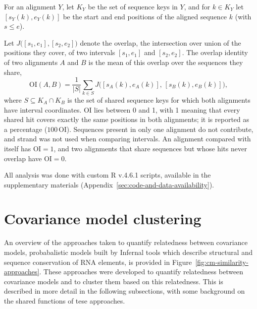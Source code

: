 For an alignment $Y$, let $K_Y$ be the set of sequence keys in $Y$, and for $k \in K_Y$ let $[s_Y(k), e_Y(k)]$ be the start and end positions of the aligned sequence $k$ (with $s \le e$).
 
Let $J\bigl([s_1, e_1], [s_2, e_2]\bigr)$ denote the overlap, the intersection over union of the positions they cover, of two intervals $[s_1, e_1]$ and $[s_2, e_2]$.
The overlap identity of two alignments $A$ and $B$ is the mean of this overlap over the sequences they share,
\begin{equation}
  \label{eq:overlap-identity}
  \mathrm{OI}(A, B) = \frac{1}{|S|} \sum_{k \in S}
  J\bigl([s_A(k), e_A(k)],\, [s_B(k), e_B(k)]\bigr),
\end{equation}
where $S \subseteq K_A \cap K_B$ is the set of shared sequence keys for which both alignments have interval coordinates.
$\mathrm{OI}$ lies between 0 and 1, with 1 meaning that every shared hit covers exactly the same positions in both alignments; it is reported as a percentage ($100\,\mathrm{OI}$).
Sequences present in only one alignment do not contribute, and strand was not used when comparing intervals.
An alignment compared with itself has $\mathrm{OI} = 1$, and two alignments that share sequences but whose hits never overlap have $\mathrm{OI} = 0$.

All analysis was done with custom R v.4.6.1 scripts, available in the supplementary materials (Appendix~\ref{sec:code-and-data-availability}).


\section{Covariance model clustering}
\label{sec:cm-simile}

An overview of the approaches taken to quantify relatedness between covariance models, probabalistic models built by Infernal tools which describe structural and sequence conservation of RNA elements, is provided in Figure~\ref{fig:cm-similarity-approaches}.
These approaches were developed to quantify relatedness between covariance models and to cluster them based on this relatedness.
This is described in more detail in the following subsections, with some background on the shared functions of tese approaches.

